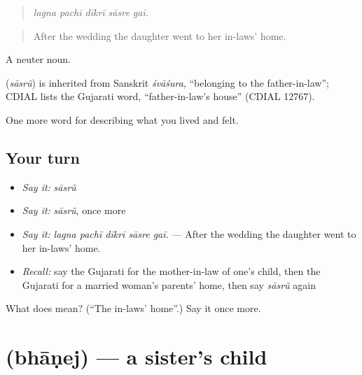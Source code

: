 \begin{quote}
\emph{lagna pachī dīkrī sāsre gaī.}
\end{quote}

\begin{quote}
After the wedding the daughter went to her in-laws' home.
\end{quote}

A neuter noun.

\begin{cousinweb}
\textbf{} (\emph{sāsrũ}) is inherited from Sanskrit \emph{śvāśura}, \textquotedblleft{}belonging to the father-in-law\textquotedblright{}; CDIAL lists the Gujarati word, \textquotedblleft{}father-in-law's house\textquotedblright{} (CDIAL 12767).
\end{cousinweb}

\begin{grammarlens}[title={What you've built}]
One more word for describing what you lived and felt.
\end{grammarlens}

\subsection*{Your turn}
\begin{itemize}
\raggedright
  \item \emph{Say it:} \emph{sāsrũ}
  \item \emph{Say it:} \emph{sāsrũ}, once more
  \item \emph{Say it:} \emph{lagna pachī dīkrī sāsre gaī.} — After the wedding the daughter went to her in-laws' home.
  \item \emph{Recall:} say the Gujarati for the mother-in-law of one's child, then the Gujarati for a married woman's parents' home, then say \emph{sāsrũ} again
\end{itemize}

\begin{tcolorbox}[breakable,colback=teal!4,colframe=teal!35!black,title={Before you move on}]
What does  mean? (\textquotedblleft{}The in-laws' home\textquotedblright{}.) Say it once more.
\end{tcolorbox}
\section[\texorpdfstring{\gu{ભાણેજ} (bhāṇej)}{ભાણેજ (bhāṇej)}]{ (bhāṇej) — a sister's child}

\label{lesson:GU-C492-bhanej}



